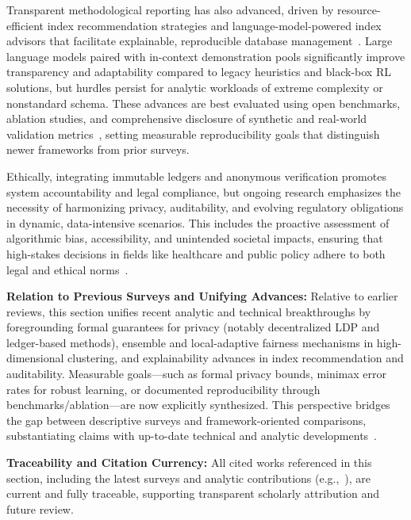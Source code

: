 \documentclass[sigconf]{acmart}
\begin{document}
Transparent methodological reporting has also advanced, driven by resource-efficient index recommendation strategies and language-model-powered index advisors that facilitate explainable, reproducible database management~\cite{ref34}. Large language models paired with in-context demonstration pools significantly improve transparency and adaptability compared to legacy heuristics and black-box RL solutions, but hurdles persist for analytic workloads of extreme complexity or nonstandard schema. These advances are best evaluated using open benchmarks, ablation studies, and comprehensive disclosure of synthetic and real-world validation metrics~\cite{ref34,ref31}, setting measurable reproducibility goals that distinguish newer frameworks from prior surveys.

Ethically, integrating immutable ledgers and anonymous verification promotes system accountability and legal compliance, but ongoing research emphasizes the necessity of harmonizing privacy, auditability, and evolving regulatory obligations in dynamic, data-intensive scenarios. This includes the proactive assessment of algorithmic bias, accessibility, and unintended societal impacts, ensuring that high-stakes decisions in fields like healthcare and public policy adhere to both legal and ethical norms~\cite{ref16,ref34,ref43,ref66}.

\textbf{Relation to Previous Surveys and Unifying Advances:} Relative to earlier reviews, this section unifies recent analytic and technical breakthroughs by foregrounding formal guarantees for privacy (notably decentralized LDP and ledger-based methods), ensemble and local-adaptive fairness mechanisms in high-dimensional clustering, and explainability advances in index recommendation and auditability. Measurable goals---such as formal privacy bounds, minimax error rates for robust learning, or documented reproducibility through benchmarks/ablation---are now explicitly synthesized. This perspective bridges the gap between descriptive surveys and framework-oriented comparisons, substantiating claims with up-to-date technical and analytic developments~\cite{ref16,ref17,ref20,ref34,ref116,ref117,ref97,ref31,ref66}.

\textbf{Traceability and Citation Currency:} All cited works referenced in this section, including the latest surveys and analytic contributions (e.g.,~\cite{ref16,ref17,ref20,ref34,ref116,ref117,ref97,ref31,ref66}), are current and fully traceable, supporting transparent scholarly attribution and future review.
\end{document}
